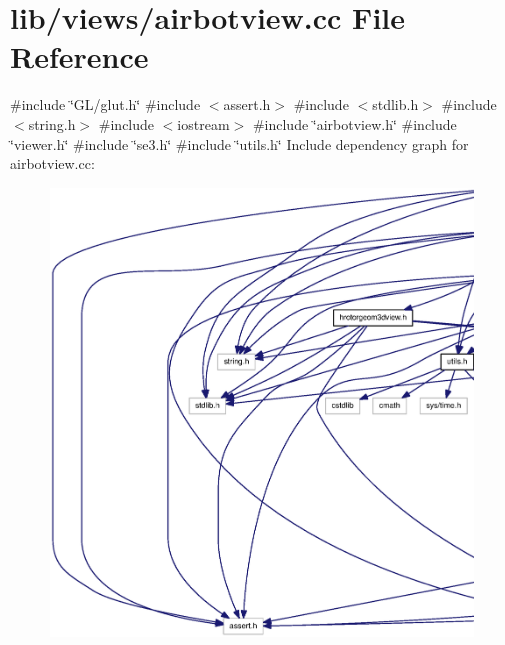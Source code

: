 \section{lib/views/airbotview.cc \-File \-Reference}
\label{airbotview_8cc}
{\ttfamily \#include \char`\"{}\-G\-L/glut.\-h\char`\"{}}\*
{\ttfamily \#include $<$assert.\-h$>$}\*
{\ttfamily \#include $<$stdlib.\-h$>$}\*
{\ttfamily \#include $<$string.\-h$>$}\*
{\ttfamily \#include $<$iostream$>$}\*
{\ttfamily \#include \char`\"{}airbotview.\-h\char`\"{}}\*
{\ttfamily \#include \char`\"{}viewer.\-h\char`\"{}}\*
{\ttfamily \#include \char`\"{}se3.\-h\char`\"{}}\*
{\ttfamily \#include \char`\"{}utils.\-h\char`\"{}}\*
\-Include dependency graph for airbotview.\-cc\-:
\nopagebreak
\begin{figure}[H]
\begin{center}
\leavevmode
\includegraphics[width=350pt]{airbotview_8cc__incl}
\end{center}
\end{figure}
